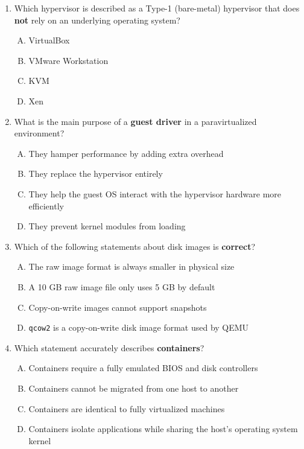 \documentclass[a4paper]{report}
\begin{document}
\begin{enumerate}[1.]

    \item Which hypervisor is described as a Type-1 (bare-metal) hypervisor that does \textbf{not} rely on an underlying operating system?  
    \begin{enumerate}[A)]
        \item VirtualBox  
        \item VMware Workstation  
        \item KVM  
        \item Xen  
    \end{enumerate}

    \item What is the main purpose of a \textbf{guest driver} in a paravirtualized environment?  
    \begin{enumerate}[A)]
        \item They hamper performance by adding extra overhead  
        \item They replace the hypervisor entirely  
        \item They help the guest OS interact with the hypervisor hardware more efficiently  
        \item They prevent kernel modules from loading  
    \end{enumerate}

    \item Which of the following statements about disk images is \textbf{correct}?  
    \begin{enumerate}[A)]
        \item The raw image format is always smaller in physical size  
        \item A 10 GB raw image file only uses 5 GB by default  
        \item Copy-on-write images cannot support snapshots  
        \item \texttt{qcow2} is a copy-on-write disk image format used by QEMU  
    \end{enumerate}

    \item Which statement accurately describes \textbf{containers}?  
    \begin{enumerate}[A)]
        \item Containers require a fully emulated BIOS and disk controllers  
        \item Containers cannot be migrated from one host to another  
        \item Containers are identical to fully virtualized machines  
        \item Containers isolate applications while sharing the host’s operating system kernel  
    \end{enumerate}


\end{enumerate}
\end{document}

